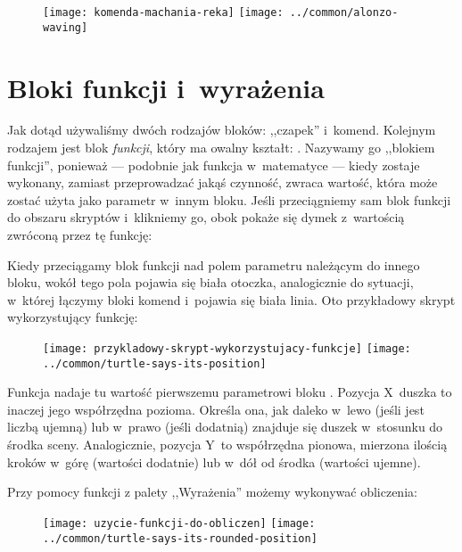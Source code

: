 \documentclass{report}
\begin{document}
\begin{figure}[H]
\centering
\texttt{[image: komenda-machania-reka]}%
\hspace{2em}%
\texttt{[image: ../common/alonzo-waving]}
\end{figure}

\section{Bloki funkcji i~wyrażenia}

Jak dotąd używaliśmy dwóch rodzajów bloków: ,,czapek'' i~komend. Kolejnym rodzajem jest blok \emph{funkcji}, który ma owalny kształt: . Nazywamy go ,,blokiem funkcji'', ponieważ --- podobnie jak funkcja w~matematyce --- kiedy zostaje wykonany, zamiast przeprowadzać jakąś czynność, zwraca wartość, która może zostać użyta jako parametr w~innym bloku. Jeśli przeciągniemy sam blok funkcji do obszaru skryptów i~klikniemy go, obok pokaże się dymek z~wartością zwróconą przez tę funkcję:


Kiedy przeciągamy blok funkcji nad polem parametru należącym do innego bloku, wokół tego pola pojawia się biała otoczka, analogicznie do sytuacji, w~której łączymy bloki komend i~pojawia się biała linia. Oto przykładowy skrypt wykorzystujący funkcję:

\begin{figure}[H]
\centering
\texttt{[image: przykladowy-skrypt-wykorzystujacy-funkcje]}%
\hspace{2em}%
\texttt{[image: ../common/turtle-says-its-position]}
\end{figure}

Funkcja  nadaje tu wartość pierwszemu parametrowi bloku . Pozycja X~duszka to inaczej jego współrzędna pozioma. Określa ona, jak daleko w~lewo (jeśli jest liczbą ujemną) lub w~prawo (jeśli dodatnią) znajduje się duszek w~stosunku do środka sceny. Analogicznie, pozycja Y~to współrzędna pionowa, mierzona ilością kroków w~górę (wartości dodatnie) lub w~dół od środka (wartości ujemne).

Przy pomocy funkcji z palety ,,Wyrażenia'' możemy wykonywać obliczenia:

\begin{figure}[H]
\centering
\texttt{[image: uzycie-funkcji-do-obliczen]}%
\hspace{2em}%
\texttt{[image: ../common/turtle-says-its-rounded-position]}
\end{figure}
\end{document}
